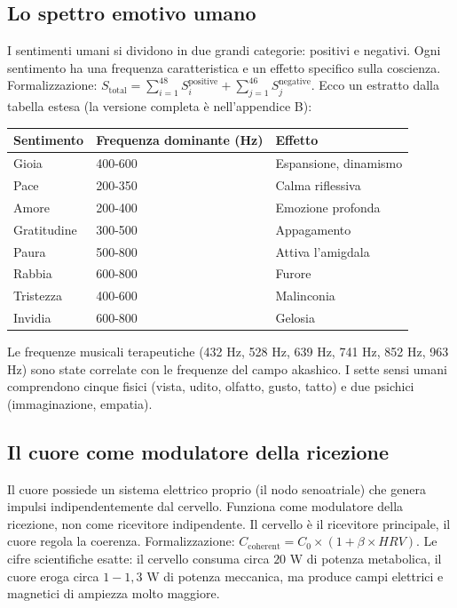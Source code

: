 \documentclass[11pt,a4paper]{article}
\begin{document}
\subsection{Lo spettro emotivo umano}
I sentimenti umani si dividono in due grandi categorie: positivi e negativi. Ogni sentimento ha una frequenza caratteristica e un effetto specifico sulla coscienza. Formalizzazione: $S_{\text{total}} = \sum_{i=1}^{48} S_i^{\text{positive}} + \sum_{j=1}^{46} S_j^{\text{negative}}$. Ecco un estratto dalla tabella estesa (la versione completa è nell'appendice B):
\begin{table}[H]
\centering
\begin{tabular}{@{}lll@{}}
\toprule
\textbf{Sentimento} & \textbf{Frequenza dominante (Hz)} & \textbf{Effetto} \\ \midrule
Gioia & 400-600 & Espansione, dinamismo \\
Pace & 200-350 & Calma riflessiva \\
Amore & 200-400 & Emozione profonda \\
Gratitudine & 300-500 & Appagamento \\
Paura & 500-800 & Attiva l'amigdala \\
Rabbia & 600-800 & Furore \\
Tristezza & 400-600 & Malinconia \\
Invidia & 600-800 & Gelosia \\ \bottomrule
\end{tabular}
\end{table}
Le frequenze musicali terapeutiche (432 Hz, 528 Hz, 639 Hz, 741 Hz, 852 Hz, 963 Hz) sono state correlate con le frequenze del campo akashico. I sette sensi umani comprendono cinque fisici (vista, udito, olfatto, gusto, tatto) e due psichici (immaginazione, empatia).

\subsection{Il cuore come modulatore della ricezione}
Il cuore possiede un sistema elettrico proprio (il nodo senoatriale) che genera impulsi indipendentemente dal cervello. Funziona come modulatore della ricezione, non come ricevitore indipendente. Il cervello è il ricevitore principale, il cuore regola la coerenza. Formalizzazione: $C_{\text{coherent}} = C_0 \times (1 + \beta \times HRV)$. Le cifre scientifiche esatte: il cervello consuma circa $20$ W di potenza metabolica, il cuore eroga circa $1-1,3$ W di potenza meccanica, ma produce campi elettrici e magnetici di ampiezza molto maggiore.
\end{document}

